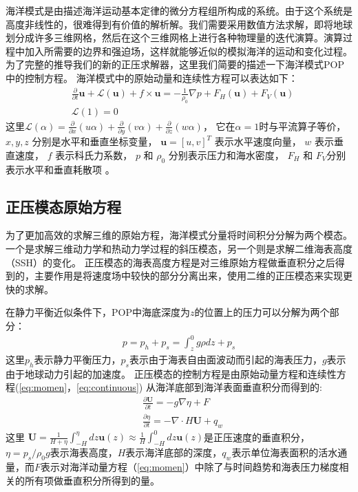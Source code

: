 海洋模式是由描述海洋运动基本定律的微分方程组所构成的系统。由于这个系统是高度非线性的，很难得到有价值的解析解。我们需要采用数值方法求解，即将地球划分成许多三维网格，然后在这个三维网格上进行各种物理量的迭代演算。演算过程中加入所需要的边界和强迫场，这样就能够近似的模拟海洋的运动和变化过程。
为了完整的推导我们的新的正压求解器，这里我们简要的描述一下海洋模式POP中的控制方程。
海洋模式中的原始动量和连续性方程可以表达如下：
\begin{align}
&\frac{\partial }{\partial t} \textbf{u} +\mathcal{L}(\textbf{u}) + f\times \textbf{u} = - \frac{1}{\rho_0}\nabla p +F_H(\textbf{u}) +F_V(\textbf{u}) \label{eq:momen}\\
&\mathcal{L}(1) = 0 \label{eq:continuous}
\end{align}
这里$\mathcal{L}(\alpha ) = \frac{\partial }{\partial x} (u\alpha)  +\frac{\partial }{\partial y} (v\alpha) +\frac{\partial }{\partial z} (w\alpha)$， 它在$\alpha =1$时与平流算子等价， $x, y, z$ 分别是水平和垂直坐标变量， $\textbf{u} = [u, v]^T$ 表示水平速度向量， $w$ 表示垂直速度， $f$ 表示科氏力系数，  $p$ 和 $\rho_0$ 分别表示压力和海水密度， $F_H$ 和 $F_V$分别表示水平和垂直耗散项 \cite{smith2010parallel}。  


\subsection{正压模态原始方程} \label{solver:mode}

为了更加高效的求解三维的原始方程，海洋模式分量将时间积分分解为两个模态。 一个是求解三维动力学和热动力学过程的斜压模态，另一个则是求解二维海表高度（SSH）的变化。
正压模态的海表高度方程是对三维原始方程做垂直积分之后得到的，主要作用是将速度场中较快的部分分离出来，使用二维的正压模态来实现更快的求解。

在静力平衡近似条件下，POP中海底深度为$z$的位置上的压力可以分解为两个部分：  
\begin{align}
\displaystyle p = p_h + p_s = \int^0_z g\rho dz +p_s
\end{align}
这里$p_h$表示静力平衡压力，$p_s$表示由于海表自由面波动而引起的海表压力，$g$表示由于地球动力引起的加速度。 
正压模态的控制方程是由原始动量方程和连续性方程(\ref{eq:momen}，\ref{eq:continuous}) 从海洋底部到海洋表面垂直积分而得到的:
\begin{align}
&\displaystyle \frac{\partial \textbf{U} }{\partial t}  = -g \nabla \eta + F  \label{eq:baro_mon}\\
&\displaystyle \frac{\partial \eta }{\partial t} = - \nabla \cdot H\textbf{U} + q_w  \label{eq:baro_con}
\end{align}
这里  $\textbf{U} =  \frac{1}{H+\eta}\int_{-H}^\eta dz \textbf{u}(z) \approx \frac{1}{H }\int_{-H}^0 dz \textbf{u}(z)$是正压速度的垂直积分，
$\eta = p_s/{\rho_0g}$表示海表高度，$H$表示海洋底部的深度，$q_w$表示单位海表面积的活水通量，而$F$表示对海洋动量方程（\ref{eq:momen}）中除了与时间趋势和海表压力梯度相关的所有项做垂直积分所得到的量。
 
